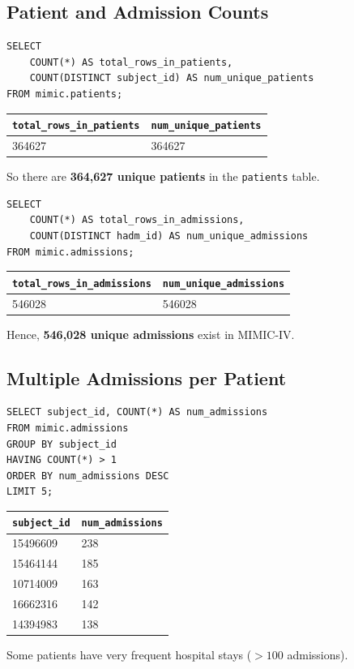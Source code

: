 \documentclass[12pt,a4paper]{report}
\begin{document}
\subsection{Patient and Admission Counts}
\begin{verbatim}
SELECT
    COUNT(*) AS total_rows_in_patients,
    COUNT(DISTINCT subject_id) AS num_unique_patients
FROM mimic.patients;
\end{verbatim}
\begin{center}
\begin{tabular}{l|l}
\hline
\texttt{total\_rows\_in\_patients} & \texttt{num\_unique\_patients} \\
\hline
364627 & 364627 \\
\hline
\end{tabular}
\end{center}
So there are \textbf{364,627 unique patients} in the \texttt{patients} table.

\begin{verbatim}
SELECT
    COUNT(*) AS total_rows_in_admissions,
    COUNT(DISTINCT hadm_id) AS num_unique_admissions
FROM mimic.admissions;
\end{verbatim}
\begin{center}
\begin{tabular}{l|l}
\hline
\texttt{total\_rows\_in\_admissions} & \texttt{num\_unique\_admissions} \\
\hline
546028 & 546028 \\
\hline
\end{tabular}
\end{center}
Hence, \textbf{546,028 unique admissions} exist in MIMIC-IV.

\subsection{Multiple Admissions per Patient}
\begin{verbatim}
SELECT subject_id, COUNT(*) AS num_admissions
FROM mimic.admissions
GROUP BY subject_id
HAVING COUNT(*) > 1
ORDER BY num_admissions DESC
LIMIT 5;
\end{verbatim}
\begin{center}
\begin{tabular}{l|l}
\hline
\texttt{subject\_id} & \texttt{num\_admissions} \\
\hline
15496609 & 238 \\
15464144 & 185 \\
10714009 & 163 \\
16662316 & 142 \\
14394983 & 138 \\
\hline
\end{tabular}
\end{center}
Some patients have very frequent hospital stays (\(>100\) admissions).
\end{document}
